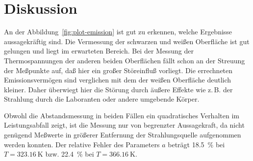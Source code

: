 \section{Diskussion}

An der Abbildung~\ref{fig:plot-emission} ist gut zu erkennen, welche
Ergebnisse aussagekräftig sind. Die Vermessung der schwarzen und weißen
Oberfläche ist gut gelungen und liegt im erwarteten Bereich. Bei der
Messung der Thermospannungen der anderen beiden Oberflächen fällt schon
an der Streuung der Meßpunkte auf, daß hier ein großer Störeinfluß
vorliegt. Die errechneten Emissionsvermögen sind verglichen mit dem der
weißen Oberfläche deutlich kleiner. Daher überwiegt hier die Störung
durch äußere Effekte wie z.\,B. der Strahlung durch die Laboranten oder 
andere umgebende Körper.

Obwohl die Abstandsmessung in beiden Fällen ein quadratisches Verhalten
im Leistungsabfall zeigt, ist die Messung nur von begrenzter
Aussagekraft, da nicht genügend Meßwerte in größerer Entfernung der
Strahlungsquelle aufgenommen werden konnten. Der relative Fehler des
Parameters $a$ beträgt \SI{18.5}{\percent} bei $T = \SI{323.16}{\kelvin}$
bzw. \SI{22.4}{\percent} bei $T = \SI{366.16}{\kelvin}$.
